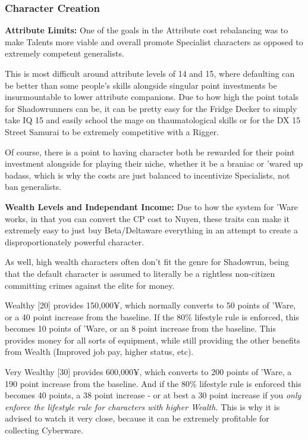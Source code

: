 \begin{multicols*}{2}
	\subsubsection{Character Creation}
	
	\textbf{Attribute Limits: } One of the goals in the Attribute cost rebalancing was to make Talents more viable and overall promote Specialist characters as opposed to extremely competent generalists. 
	
	This is most difficult around attribute levels of 14 and 15, where defaulting can be better than some people's skills alongside singular point investments be insurmountable to lower attribute companions. Due to how high the point totals for Shadowrunners can be, it can be pretty easy for the Fridge Decker to simply take IQ 15 and easily school the mage on thaumatological skills or for the DX 15 Street Samurai to be extremely competitive with a Rigger.
	
	Of course, there is a point to having character both be rewarded for their point investment alongside for playing their niche, whether it be a braniac or 'wared up badass, which is why the costs are just balanced to incentivize Specialists, not ban generalists.
	
	\textbf{Wealth Levels and Independant Income: } Due to how the system for 'Ware works, in that you can convert the CP cost to Nuyen, these traits can make it extremely easy to just buy Beta/Deltaware everything in an attempt to create a disproportionately powerful character.
	
	As well, high wealth characters often don't fit the genre for Shadowrun, being that the default character is assumed to literally be a rightless non-citizen committing crimes against the elite for money.
	
	Wealthy [20] provides 150,000¥, which normally converts to 50 points of 'Ware, or a 40 point increase from the baseline. If the 80\% lifestyle rule is enforced, this becomes 10 points of 'Ware, or an 8 point increase from the baseline. This provides money for all sorts of equipment, while still providing the other benefits from Wealth (Improved job pay, higher status, etc).
	
	Very Wealthy [30] provides 600,000¥, which converts to 200 points of 'Ware, a 190 point increase from the baseline. And if the 80\% lifestyle rule is enforced this becomes 40 points, a 38 point increase - or at best a 30 point increase if you \textit{only enforce the lifestyle rule for characters with higher Wealth.} This is why it is advised to watch it very close, because it can be extremely profitable for collecting Cyberware. 
	

\end{multicols*}
